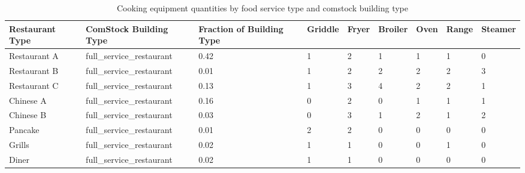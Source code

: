 \begin{table}[]
    \small
    \centering
    \caption[Cooking equipment quantities by food service type and comstock building type]{Cooking equipment quantities by food service type and comstock building type}
    \label{tab:kitchen_cook_counts}
    \begin{tabular}{|l|l|l|l|l|l|l|l|l|}
    \hline
    \textbf{Restaurant Type} & \textbf{ComStock Building Type} & \textbf{Fraction of Building Type} & \textbf{Griddle} & \textbf{Fryer} & \textbf{Broiler} & \textbf{Oven} & \textbf{Range} & \textbf{Steamer} \\ \hline
    Restaurant A             & full\_service\_restaurant       & 0.42                               & 1                & 2              & 1                & 1             & 1              & 0                \\ \hline
    Restaurant B             & full\_service\_restaurant       & 0.01                               & 1                & 2              & 2                & 2             & 2              & 3                \\ \hline
    Restaurant C             & full\_service\_restaurant       & 0.13                               & 1                & 3              & 4                & 2             & 2              & 1                \\ \hline
    Chinese A                & full\_service\_restaurant       & 0.16                               & 0                & 2              & 0                & 1             & 1              & 1                \\ \hline
    Chinese B                & full\_service\_restaurant       & 0.03                               & 0                & 3              & 1                & 2             & 1              & 2                \\ \hline
    Pancake                  & full\_service\_restaurant       & 0.01                               & 2                & 2              & 0                & 0             & 0              & 0                \\ \hline
    Grills                   & full\_service\_restaurant       & 0.02                               & 1                & 1              & 0                & 0             & 1              & 0                \\ \hline
    Diner                    & full\_service\_restaurant       & 0.02                               & 1                & 1              & 0                & 0             & 0              & 0                \\ \hline

\end{tabular}
\end{table}
